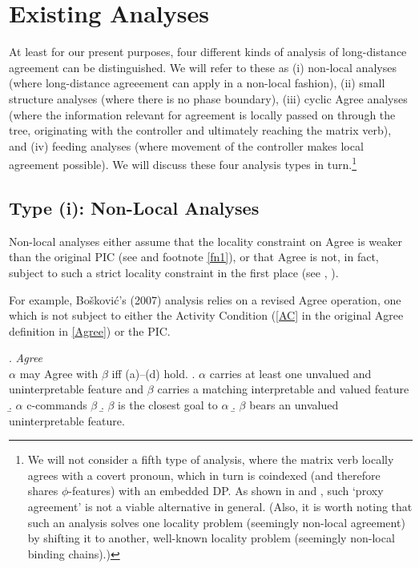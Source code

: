\documentclass[output=paper
,modfonts
,nonflat]{langsci/langscibook}
\begin{document}
\section{Existing Analyses}

At least for our present purposes, four different kinds of analysis
of long-distance agreement can be distinguished. We will refer to
these as (i) non-local analyses (where long-distance agreeement can
apply in a non-local fashion),  (ii) small structure analyses (where
there is no phase boundary), (iii) cyclic Agree analyses (where the
information relevant for agreement is locally passed on through the
tree, originating with the controller and ultimately reaching the
matrix verb), and (iv) feeding analyses (where movement
of the controller makes 
local agreement possible). We will discuss these four analysis types in
turn.\footnote{We will not consider a fifth type of analysis, where
  the matrix verb locally agrees with a covert pronoun, which in turn
  is coindexed (and therefore shares $\phi$-features) with an
  embedded DP. As shown in \cite{Polinsky&Potsdam:01} and
  \cite{Bhatt&Keine:16:lon}, such `proxy agreement' is not a viable
  alternative in general. (Also, it is worth noting that such an
  analysis solves one locality problem (seemingly non-local agreement)
by shifting it to another, well-known locality problem (seemingly
non-local binding chains).)}

\subsection{Type (i): Non-Local Analyses}

Non-local analyses either assume that the locality constraint on Agree
is weaker than the original PIC (see \cite{Chomsky:01} and footnote
\ref{fn1}), or that Agree is not, in fact, subject to such a strict
locality constraint in the first place (see \cite{Sells:06} \cite{Boskovic:07},
\cite{Keine:16}).

For example, Bo\v{s}kovi{\'c}'s (2007) analysis relies on a revised
Agree operation, one which is not subject to either the  Activity
  Condition (\ref{AC} in the original Agree definition in
\ref{Agree}) or the PIC. 

\Lsciex. \label{Agree}{\it Agree} \\ $\alpha$ may Agree with $\beta$ iff
(a)--(d) hold.
\a.  $\alpha$ carries at least one unvalued and uninterpretable
      feature and $\beta$ carries a matching interpretable and valued
      feature 
\b.  $\alpha$ c-commands $\beta$
    \b. \label{AgreeClosest}$\beta$ is the closest goal to $\alpha$
\b. \label{AC}$\beta$ bears an unvalued uninterpretable feature.
\end{document}
